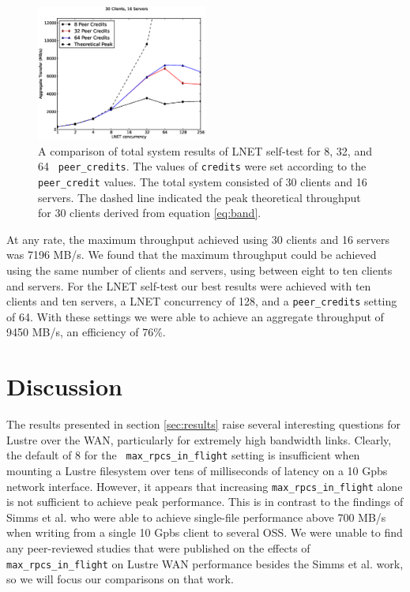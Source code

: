 \documentclass[]{sigplan-proc}
\begin{document}
\begin{figure}
\centering
\includegraphics[width=0.50\textwidth]{figures/all_pc_theory_plot.eps}
\caption{A comparison of total system results of LNET self-test for 8, 32, and 64 {\tt
    peer\_credits}. The values of {\tt credits} were set according to the {\tt peer\_credit} values. The total
system consisted of 30 clients and 16 servers. The dashed line indicated the peak theoretical throughput for
30 clients derived from equation \ref{eq:band}.}
\label{fig:allserver}
\end{figure}

At any rate, the maximum throughput achieved using 30 clients and 16 servers was 7196 MB/s. We found that the
maximum throughput could be achieved using the same number of clients and servers, using between eight to ten
clients and servers. For the LNET self-test our best results were achieved with ten clients and ten servers, a
LNET concurrency of 128, and a {\tt peer\_credits} setting of 64. With these settings we were able to achieve
an aggregate throughput of 9450 MB/s, an efficiency of 76\%.

\section{Discussion}\label{sec:discussion} 

The results presented in section \ref{sec:results} raise several interesting questions for Lustre over the
WAN, particularly for extremely high bandwidth links. Clearly, the default of 8 for the {\tt
  max\_rpcs\_in\_flight} setting is insufficient when mounting a Lustre filesystem over tens of milliseconds
of latency on a 10 Gpbs network interface. However, it appears that increasing {\tt max\_rpcs\_in\_flight}
alone is not sufficient to achieve peak performance. This is in contrast to the findings of Simms et
al. \cite{simms2007} who were able to achieve single-file performance above 700 MB/s when writing from a
single 10 Gpbs client to several OSS. We were unable to find any peer-reviewed studies that were published on
the effects of {\tt max\_rpcs\_in\_flight} on Lustre WAN performance besides the Simms et al. work, so we will
focus our comparisons on that work.
\end{document}
